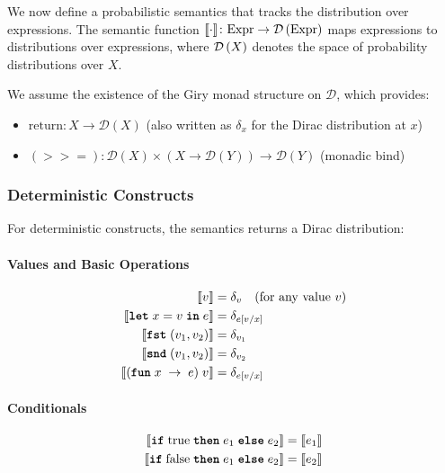 We now define a probabilistic semantics that tracks the distribution over expressions. The semantic function $\llbracket \cdot \rrbracket \colon \text{Expr} \rightarrow \mathcal{D}\left( \text{Expr} \right)$ maps expressions to distributions over expressions, where $\mathcal{D}\left( X \right)$ denotes the space of probability distributions over $X$.

We assume the existence of the Giry monad structure on $\mathcal{D}$, which provides:
\begin{itemize}
    \item $\text{return} : X \rightarrow \mathcal{D}(X)$ (also written as $\delta_x$ for the Dirac distribution at $x$)
    \item $(>>=) : \mathcal{D}(X) \times (X \rightarrow \mathcal{D}(Y)) \rightarrow \mathcal{D}(Y)$ (monadic bind)
\end{itemize}

\subsubsection{Deterministic Constructs}

For deterministic constructs, the semantics returns a Dirac distribution:

\paragraph{Values and Basic Operations}
\begin{align*}
\llbracket v \rrbracket &= \delta_v \quad \text{(for any value } v \text{)} \\
\llbracket \text{\ttfamily\bfseries let} \; x = v \; \text{\ttfamily\bfseries in} \; e \rrbracket &= \delta_{e[v/x]} \\
\llbracket  \text{\ttfamily\bfseries fst} \; (v_1, v_2)  \rrbracket &= \delta_{v_1} \\
\llbracket  \text{\ttfamily\bfseries snd} \; (v_1, v_2)  \rrbracket &= \delta_{v_2} \\
\llbracket  (\text{\ttfamily\bfseries fun} \; x \; \rightarrow \; e) \; v  \rrbracket &= \delta_{e[v/x]}
\end{align*}

\paragraph{Conditionals}
\begin{align*}
\llbracket \text{\ttfamily\bfseries if} \; \text{true} \; \text{\ttfamily\bfseries then} \; e_1 \; \text{\ttfamily\bfseries else} \; e_2 \rrbracket &= \llbracket e_1 \rrbracket \\
\llbracket \text{\ttfamily\bfseries if} \; \text{false} \; \text{\ttfamily\bfseries then} \; e_1 \; \text{\ttfamily\bfseries else} \; e_2 \rrbracket &= \llbracket e_2 \rrbracket
\end{align*}

